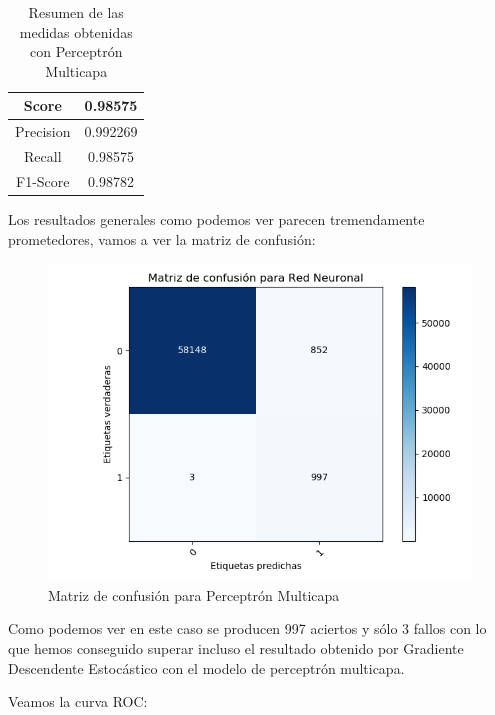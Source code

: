\begin{table}[H]
	\centering
	\begin{tabular}{|c|c|}
		\hline
		Score     & 0.98575   \\ \hline
		Precision & 0.992269  \\ \hline
		Recall    & 0.98575   \\ \hline
		F1-Score  & 0.98782 \\ \hline
	\end{tabular}
	\caption{Resumen de las medidas obtenidas con Perceptrón Multicapa}
\end{table}

Los resultados generales como podemos ver parecen tremendamente prometedores, vamos a ver la matriz de confusión:

\begin{figure}[H] %
	\centering
	\includegraphics[scale=0.6]{CONF-NEURONAL.png}  %
	\caption{Matriz de confusión para Perceptrón Multicapa} 
	\label{fig:conf-pmc}
\end{figure}

Como podemos ver en este caso se producen 997 aciertos y sólo 3 fallos con lo que hemos conseguido superar incluso el resultado obtenido por Gradiente Descendente Estocástico con el modelo de perceptrón multicapa.

Veamos la curva ROC:

